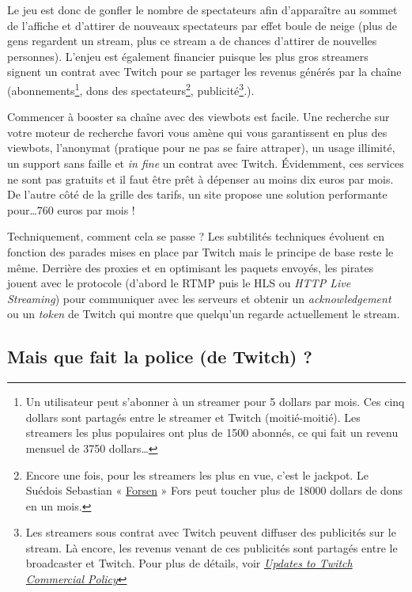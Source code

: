 \documentclass[a4paper]{article}
\begin{document}
Le jeu est donc de gonfler le nombre de spectateurs afin d'apparaître au sommet de l'affiche et d'attirer de nouveaux spectateurs par effet boule de neige (plus de gens regardent un stream, plus ce stream a de chances d'attirer de nouvelles personnes). L'enjeu est également financier puisque les plus gros streamers signent un contrat avec Twitch pour se partager les revenus générés par la chaîne (abonnements\footnote{Un utilisateur peut s'abonner à un streamer pour 5 dollars par mois. Ces cinq dollars sont partagés entre le streamer et Twitch (moitié-moitié). Les streamers les plus populaires ont plus de 1500 abonnés, ce qui fait un revenu mensuel de 3750 dollars\ldots}, dons des spectateurs\footnote{Encore une fois, pour les streamers les plus en vue, c'est le jackpot. Le Suédois Sebastian « \href{https://www.twitch.tv/forsenlol}{Forsen} » Fors peut toucher plus de 18000 dollars de dons en un mois.}, publicité\footnote{Les streamers sous contrat avec Twitch peuvent diffuser des publicités sur le stream. Là encore, les revenus venant de ces publicités sont partagés entre le broadcaster et Twitch. Pour plus de détails, voir \href{https://blog.twitch.tv/updates-to-twitch-commercial-policy-a35f5ce89afa}{\textit{Updates to Twitch Commercial Policy}}}.).

Commencer à booster sa chaîne avec des viewbots est facile. Une recherche sur votre moteur de recherche favori vous amène qui vous garantissent en plus des viewbots, l'anonymat (pratique pour ne pas se faire attraper), un usage illimité, un support sans faille et \textit{in fine} un contrat avec Twitch. Évidemment, ces services ne sont pas gratuits et il faut être prêt à dépenser au moins dix euros par mois. De l'autre côté de la grille des tarifs, un site propose une solution performante pour\ldots 760 euros par mois\cite{TropCher} ! 

Techniquement, comment cela se passe ? Les subtilités techniques évoluent en fonction des parades mises en place par Twitch mais le principe de base reste le même. Derrière des proxies et en optimisant les paquets envoyés, les pirates jouent avec le protocole (d'abord le RTMP puis le HLS ou \textit{HTTP Live Streaming}) pour communiquer avec les serveurs et obtenir un \textit{acknowledgement} ou un \textit{token} de Twitch qui montre que quelqu'un regarde actuellement le stream. 

\subsection{Mais que fait la police (de Twitch) ?}
\end{document}
